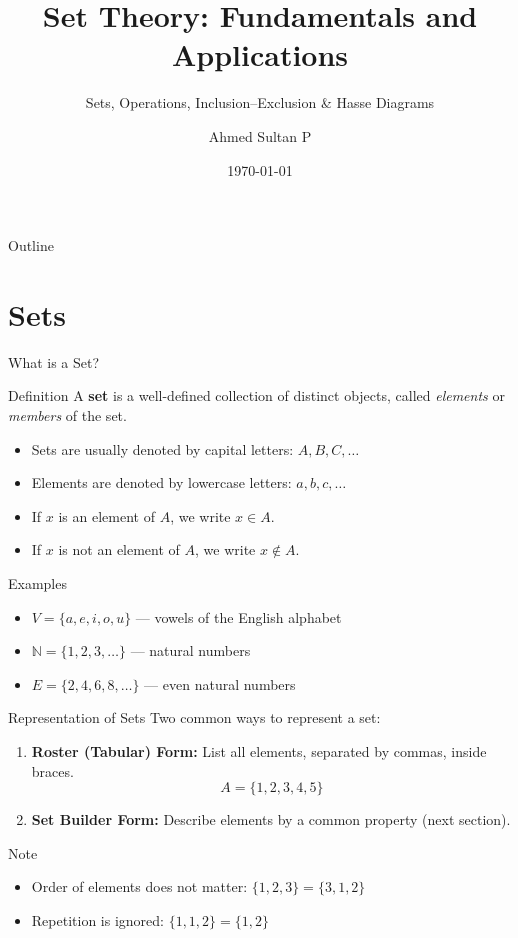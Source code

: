\documentclass{beamer}
\title[Set Theory]{Set Theory: Fundamentals and Applications}
\subtitle{Sets, Operations, Inclusion--Exclusion \& Hasse Diagrams}
\author{Ahmed Sultan P}
\institute{IMSc 24}
\date{\today}
\begin{document}
\begin{frame}
  \titlepage
\end{frame}

\begin{frame}{Outline}
  \tableofcontents
\end{frame}

\section{Sets}
\begin{frame}{What is a Set?}
  \begin{block}{Definition}
    A \textbf{set} is a well-defined collection of distinct objects,
    called \emph{elements} or \emph{members} of the set.
  \end{block}
  \pause
  \begin{itemize}
    \item Sets are usually denoted by capital letters: $A, B, C, \dots$
    \item Elements are denoted by lowercase letters: $a, b, c, \dots$
    \item If $x$ is an element of $A$, we write $x \in A$.
    \item If $x$ is not an element of $A$, we write $x \notin A$.
  \end{itemize}
  \pause
  \begin{exampleblock}{Examples}
    \begin{itemize}
      \item $V = \{a, e, i, o, u\}$ --- vowels of the English alphabet
      \item $\mathbb{N} = \{1, 2, 3, \dots\}$ --- natural numbers
      \item $E = \{2, 4, 6, 8, \dots\}$ --- even natural numbers
    \end{itemize}
  \end{exampleblock}
\end{frame}

\begin{frame}{Representation of Sets}
  Two common ways to represent a set:
  \begin{enumerate}
    \item \textbf{Roster (Tabular) Form:} List all elements, separated
          by commas, inside braces.
          \[
            A = \{1, 2, 3, 4, 5\}
          \]
    \item \textbf{Set Builder Form:} Describe elements by a common
          property (next section).
  \end{enumerate}
  \pause
  \begin{alertblock}{Note}
    \begin{itemize}
      \item Order of elements does not matter: $\{1,2,3\} = \{3,1,2\}$
      \item Repetition is ignored: $\{1,1,2\} = \{1,2\}$
    \end{itemize}
  \end{alertblock}
\end{frame}
\end{document}

